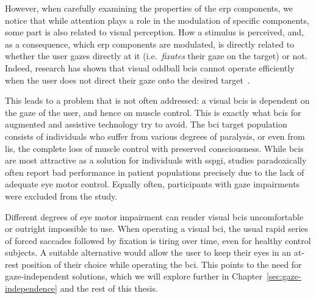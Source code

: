 However, when carefully examining the properties of the \ac{erp} components,
we notice that while attention plays a role in the modulation of specific components,
some part is also related to visual perception.
How a stimulus is perceived, and, as a consequence, which \ac{erp} components
are modulated, is directly related to whether the user gazes directly at it
(i.e.\ \emph{fixates} their gaze on the target) or not.
Indeed, research has shown that visual oddball \ac{bci}s cannot operate
efficiently when the user does not direct
their gaze onto the desired target~\cite{Brunner2010, Frenzel2011}.

This leads to a problem that is not often addressed:
a visual \acp{bci} is dependent on the gaze of the user, and hence on
muscle control.
This is exactly what \acp{bci} for augmented and assistive technology try to
avoid.
The \ac{bci} target population consists of individuals who suffer from various
degrees of paralysis, or even from \ac{lis}, the complete loss of muscle
control with preserved consciousness.
While \ac{bci}s are most attractive as a solution for individuals with
\ac{sspgi}, studies
paradoxically often report bad performance in patient populations precisely due
to the lack of adequate eye motor control.
Equally often, participants with gaze impairments were excluded from the study.

Different degrees of eye motor impairment can render visual \ac{bci}s
uncomfortable or outright impossible to use.
When operating a visual \ac{bci}, the usual rapid series of forced saccades
followed by fixation is tiring over time, even for healthy control subjects.
A suitable alternative would allow the user to keep their eyes in an at-rest
position of their choice while operating the \ac{bci}.
This points to the need for gaze-independent solutions, which we will explore
further in Chapter~\ref{sec:gaze-independence} and the rest of this thesis.
